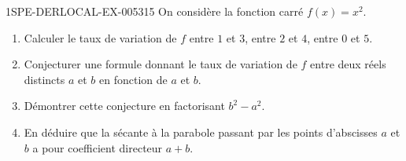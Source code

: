 \begin{exercice}{1SPE-DERLOCAL-EX-005}{3}{15}
On considère la fonction carré $f(x)=x^2$.

\begin{enumerate}
  \item Calculer le taux de variation de $f$ entre $1$ et $3$, entre $2$ et $4$, entre $0$ et $5$.
  \item Conjecturer une formule donnant le taux de variation de $f$ entre deux réels distincts $a$ et $b$ en fonction de $a$ et $b$.
  \item Démontrer cette conjecture en factorisant $b^2-a^2$.
  \item En déduire que la sécante à la parabole passant par les points d'abscisses $a$ et $b$ a pour coefficient directeur $a+b$.
\end{enumerate}
\end{exercice}
